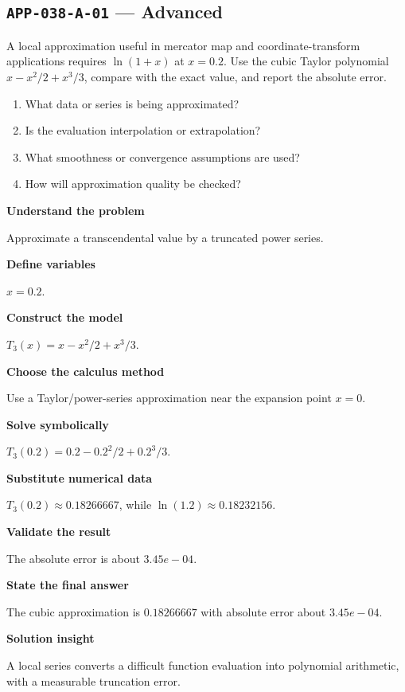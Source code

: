 \documentclass[11pt]{book}
\newcommand{\pid}[1]{\texttt{#1}}
\begin{document}
\subsection*{\pid{APP-038-A-01} — Advanced}
\begin{problembox}
A local approximation useful in mercator map and coordinate-transform applications requires $\ln(1+x)$ at $x=0.2$. Use the cubic Taylor polynomial $x-x^2/2+x^3/3$, compare with the exact value, and report the absolute error.
\end{problembox}
\begin{promptbox}\begin{enumerate}
\item What data or series is being approximated?
\item Is the evaluation interpolation or extrapolation?
\item What smoothness or convergence assumptions are used?
\item How will approximation quality be checked?
\end{enumerate}\end{promptbox}
\begin{solutionbox}
\textbf{Understand the problem}\par Approximate a transcendental value by a truncated power series.\par\medskip
\textbf{Define variables}\par $x=0.2$.\par\medskip
\textbf{Construct the model}\par $T_3(x)=x-x^2/2+x^3/3$.\par\medskip
\textbf{Choose the calculus method}\par Use a Taylor/power-series approximation near the expansion point $x=0$.\par\medskip
\textbf{Solve symbolically}\par $T_3(0.2)=0.2-0.2^2/2+0.2^3/3$.\par\medskip
\textbf{Substitute numerical data}\par $T_3(0.2)\approx 0.18266667$, while $\ln(1.2)\approx 0.18232156$.\par\medskip
\textbf{Validate the result}\par The absolute error is about $3.45e-04$.\par\medskip
\textbf{State the final answer}\par The cubic approximation is $0.18266667$ with absolute error about $3.45e-04$.\par\medskip
\textbf{Solution insight}\par A local series converts a difficult function evaluation into polynomial arithmetic, with a measurable truncation error.\par\medskip
\end{solutionbox}
\end{document}
